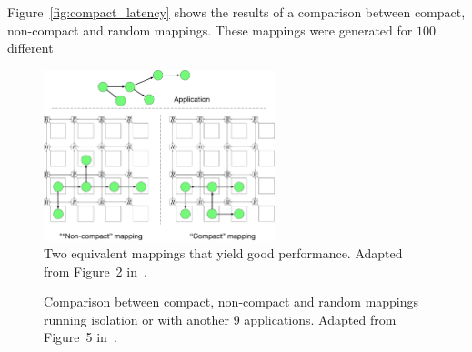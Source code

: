 Figure~\ref{fig:compact_latency} shows the results of a comparison between compact, non-compact and random mappings. 
 These mappings were generated for $100$ different 

\begin{figure}[th]
	\centering
	\includegraphics[width=0.6\textwidth]{figures/topology_vs_geometry.pdf}
	\caption{Two equivalent mappings that yield good performance. Adapted from Figure~2 in~\cite{goens_samos19}.}
	\label{fig:topology_vs_geometry}
\end{figure}



\begin{figure}[h]
	\centering
	\caption{Comparison between compact, non-compact and random mappings running isolation or with another 9 applications. Adapted from Figure~5 in~\cite{goens_samos19}.}
	\label{fig:compact_cases}
\end{figure}
